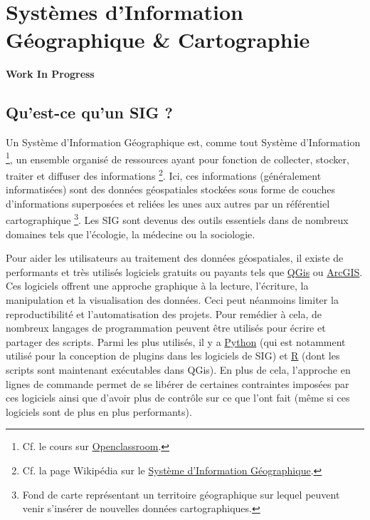 \documentclass[
  french,
]{book}
\newenvironment{infobox}[1]
  {
  \begin{itemize}
  \renewcommand{\labelitemi}{
    \raisebox{-.7\height}[0pt][0pt]{
      {\setkeys{Gin}{width=3em,keepaspectratio}
        \texttt{[image: images/\#1]}}
    }
  }
  \setlength{\fboxsep}{1em}
  \begin{blackbox}
  \item
  }
  {
  \end{blackbox}
  \end{itemize}
  }
\begin{document}
\hypertarget{SIG}{%
\chapter{Systèmes d'Information Géographique \& Cartographie}\label{SIG}}

\begin{infobox}{caution}

\textbf{Work In Progress}

\end{infobox}

\hypertarget{whatis-sig}{%
\section{Qu'est-ce qu'un SIG ?}\label{whatis-sig}}

Un Système d'Information Géographique est, comme tout Système d'Information
\footnote{Cf. le cours sur
  \href{https://openclassrooms.com/fr/courses/2100086-decouvrez-le-monde-des-systemes-dinformation}{Openclassroom}.}, un ensemble organisé de ressources ayant pour fonction de collecter,
stocker, traiter et diffuser des informations \footnote{Cf. la page Wikipédia sur le
  \href{https://fr.wikipedia.org/wiki/Syst\%C3\%A8me_d\%27information_g\%C3\%A9ographique}{Système d'Information Géographique}.}. Ici, ces informations
(généralement informatisées) sont des données géospatiales stockées sous forme
de couches d'informations superposées et reliées les unes aux autres par un
référentiel cartographique \footnote{Fond de carte représentant un territoire géographique sur lequel
  peuvent venir s'insérer de nouvelles données cartographiques.}. Les SIG sont devenus des outils
essentiels dans de nombreux domaines tels que l'écologie, la médecine ou la
sociologie.

Pour aider les utilisateurs au traitement des données géospatiales, il existe de
performants et très utilisés logiciels gratuits ou payants tels que
\href{https://www.qgis.org/fr/site/}{QGis} ou
\href{https://www.arcgis.com/index.html}{ArcGIS}. Ces logiciels offrent une approche
graphique à la lecture, l'écriture, la manipulation et la visualisation des
données. Ceci peut néanmoins limiter la reproductibilité et l'automatisation des
projets. Pour remédier à cela, de nombreux langages de programmation peuvent
être utilisés pour écrire et partager des scripts. Parmi les plus utilisés, il y
a \href{https://www.python.org/}{Python} (qui est notamment utilisé pour la
conception de plugins dans les logiciels de SIG) et
\href{https://www.r-project.org/about.html}{R} (dont les scripts sont maintenant
exécutables dans QGis). En plus de cela, l'approche en lignes de commande permet
de se libérer de certaines contraintes imposées par ces logiciels ainsi que
d'avoir plus de contrôle sur ce que l'ont fait (même si ces logiciels sont de
plus en plus performants).
\end{document}
